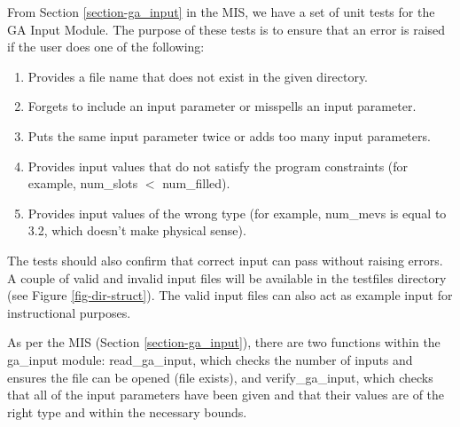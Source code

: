 \documentclass[12pt, titlepage]{article}
\begin{document}
From Section \ref{section-ga_input} in the MIS, we have a set of unit tests for 
the GA Input Module. The purpose of these tests is to ensure that an error is 
raised if the user does one of the following:
\begin{enumerate}
	\item Provides a file name that does not exist in the given directory.
	\item Forgets to include an input parameter or misspells an input parameter.
	\item Puts the same input parameter twice or adds too many input parameters.
	\item Provides input values that do not satisfy the program constraints 
	(for example, num\_slots $<$ num\_filled).
	\item Provides input values of the wrong type (for example, num\_mevs is 
	equal to 3.2, which doesn't make physical sense).
\end{enumerate}
The tests should also confirm that correct input can pass without raising 
errors. A couple of valid and invalid input files will be available in the 
testfiles directory (see Figure \ref{fig-dir-struct}). The valid input files 
can also act as example input for instructional purposes.


As per the MIS (Section \ref{section-ga_input}), there are two functions within 
the ga\_input module: read\_ga\_input, which checks the number of inputs and 
ensures the file can be opened (file exists), and verify\_ga\_input, which 
checks that all of the input parameters have been given and that their values 
are of the right type and within the necessary bounds.

\end{document}
